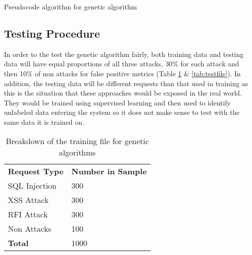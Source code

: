 \begin{algorithm}[H]
	\label{alg:genetic}
	\caption{Pseudocode algorithm for genetic algorithm}
	
\end{algorithm}

\subsection{Testing Procedure}

In order to the test the genetic algorithm fairly, both training data and testing data will have equal proportions of all three attacks, 30\% for each attack and then 10\% of non attacks for false positive metrics (Table \ref{tab:trainingfile} \& \ref{tab:testfile}).  In addition, the testing data will be different requests than that used in training as this is the situation that these approaches would be exposed in the real world.  They would be trained using supervised learning and then used to identify unlabeled data entering the system so it does not make sense to test with the same data it is trained on.

\begin{table}
	\centering
	\label{tab:trainingfile}
	\begin{tabular}{|p{1.5in}|p{1.5in}|}
	\hline
		\textbf{Request Type} & \textbf{Number in Sample}\\
	\hhline{|=|=|}
		SQL Injection & 300 \\
	\hline
		XSS Attack & 300 \\
	\hline
		RFI Attack & 300 \\
	\hline
		Non Attacks & 100 \\
	\hhline{|=|=|}
		\textbf{Total} & 1000 \\
	\hline
	\end{tabular}
	\caption{Breakdown of the training file for genetic algorithms}
\end{table}	
	
